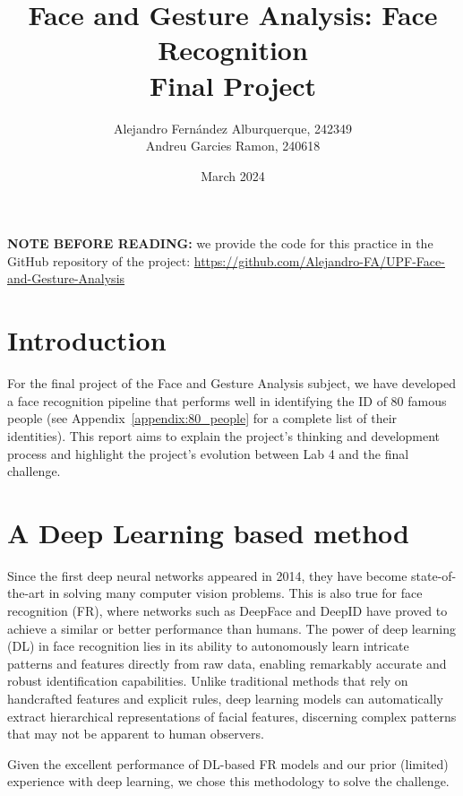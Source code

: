 \documentclass[11pt, a4paper]{article}
\numberwithin{equation}{subsection}
\begin{document}
\title{Face and Gesture Analysis: Face Recognition \\
    \large Final Project}
\author{Alejandro Fernández Alburquerque, 242349 \\ Andreu Garcies Ramon, 240618}
\date{March 2024}

\maketitle

\textbf{NOTE BEFORE READING:} we provide the code for this practice in the GitHub repository of the project: \url{https://github.com/Alejandro-FA/UPF-Face-and-Gesture-Analysis}

\section{Introduction}

For the final project of the Face and Gesture Analysis subject, we have developed a face recognition pipeline that performs well in identifying the ID of 80 famous people (see Appendix~\ref{appendix:80_people} for a complete list of their identities). This report aims to explain the project's thinking and development process and highlight the project's evolution between Lab 4 and the final challenge.


\section{A Deep Learning based method}

Since the first deep neural networks appeared in 2014, they have become state-of-the-art in solving many computer vision problems. This is also true for face recognition (FR), where networks such as DeepFace \cite{taigman2014deepface} and DeepID \cite{sun2014deep} have proved to achieve a similar or better performance than humans. The power of deep learning (DL) in face recognition lies in its ability to autonomously learn intricate patterns and features directly from raw data, enabling remarkably accurate and robust identification capabilities. Unlike traditional methods that rely on handcrafted features and explicit rules, deep learning models can automatically extract hierarchical representations of facial features, discerning complex patterns that may not be apparent to human observers.

Given the excellent performance of DL-based FR models and our prior (limited) experience with deep learning, we chose this methodology to solve the challenge.
\end{document}
